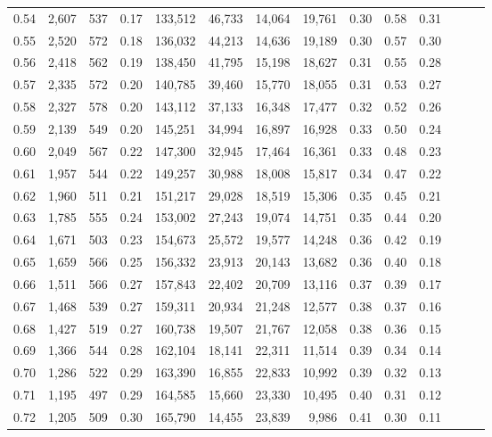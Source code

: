\begin{tabular}{rrrrrrrrrrrrrr}
0.54 &  2,607 &  537 &  0.17 &  133,512 &   46,733 &  14,064 &  19,761 &  0.30 &  0.58 &      0.31 \\
0.55 &  2,520 &  572 &  0.18 &  136,032 &   44,213 &  14,636 &  19,189 &  0.30 &  0.57 &      0.30 \\
0.56 &  2,418 &  562 &  0.19 &  138,450 &   41,795 &  15,198 &  18,627 &  0.31 &  0.55 &      0.28 \\
0.57 &  2,335 &  572 &  0.20 &  140,785 &   39,460 &  15,770 &  18,055 &  0.31 &  0.53 &      0.27 \\
0.58 &  2,327 &  578 &  0.20 &  143,112 &   37,133 &  16,348 &  17,477 &  0.32 &  0.52 &      0.26 \\
0.59 &  2,139 &  549 &  0.20 &  145,251 &   34,994 &  16,897 &  16,928 &  0.33 &  0.50 &      0.24 \\
0.60 &  2,049 &  567 &  0.22 &  147,300 &   32,945 &  17,464 &  16,361 &  0.33 &  0.48 &      0.23 \\
0.61 &  1,957 &  544 &  0.22 &  149,257 &   30,988 &  18,008 &  15,817 &  0.34 &  0.47 &      0.22 \\
0.62 &  1,960 &  511 &  0.21 &  151,217 &   29,028 &  18,519 &  15,306 &  0.35 &  0.45 &      0.21 \\
0.63 &  1,785 &  555 &  0.24 &  153,002 &   27,243 &  19,074 &  14,751 &  0.35 &  0.44 &      0.20 \\
0.64 &  1,671 &  503 &  0.23 &  154,673 &   25,572 &  19,577 &  14,248 &  0.36 &  0.42 &      0.19 \\
0.65 &  1,659 &  566 &  0.25 &  156,332 &   23,913 &  20,143 &  13,682 &  0.36 &  0.40 &      0.18 \\
0.66 &  1,511 &  566 &  0.27 &  157,843 &   22,402 &  20,709 &  13,116 &  0.37 &  0.39 &      0.17 \\
0.67 &  1,468 &  539 &  0.27 &  159,311 &   20,934 &  21,248 &  12,577 &  0.38 &  0.37 &      0.16 \\
0.68 &  1,427 &  519 &  0.27 &  160,738 &   19,507 &  21,767 &  12,058 &  0.38 &  0.36 &      0.15 \\
0.69 &  1,366 &  544 &  0.28 &  162,104 &   18,141 &  22,311 &  11,514 &  0.39 &  0.34 &      0.14 \\
0.70 &  1,286 &  522 &  0.29 &  163,390 &   16,855 &  22,833 &  10,992 &  0.39 &  0.32 &      0.13 \\
0.71 &  1,195 &  497 &  0.29 &  164,585 &   15,660 &  23,330 &  10,495 &  0.40 &  0.31 &      0.12 \\
0.72 &  1,205 &  509 &  0.30 &  165,790 &   14,455 &  23,839 &   9,986 &  0.41 &  0.30 &      0.11 \\

\end{tabular}
